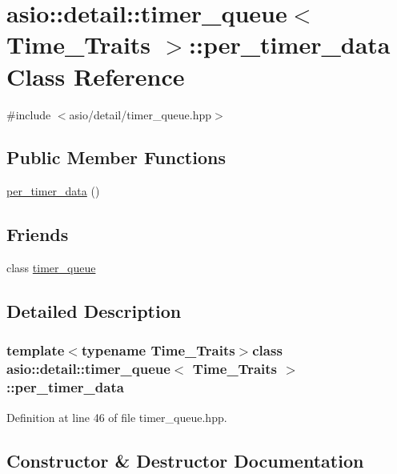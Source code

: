 \hypertarget{classasio_1_1detail_1_1timer__queue_1_1per__timer__data}{}\section{asio\+:\+:detail\+:\+:timer\+\_\+queue$<$ Time\+\_\+\+Traits $>$\+:\+:per\+\_\+timer\+\_\+data Class Reference}
\label{classasio_1_1detail_1_1timer__queue_1_1per__timer__data}


{\ttfamily \#include $<$asio/detail/timer\+\_\+queue.\+hpp$>$}

\subsection*{Public Member Functions}
\begin{DoxyCompactItemize}
\item 
\hyperlink{classasio_1_1detail_1_1timer__queue_1_1per__timer__data_a7481de4d86d55604f5c642d0fcfff383}{per\+\_\+timer\+\_\+data} ()
\end{DoxyCompactItemize}
\subsection*{Friends}
\begin{DoxyCompactItemize}
\item 
class \hyperlink{classasio_1_1detail_1_1timer__queue_1_1per__timer__data_af902b930ce23b4575f973bda3beefedc}{timer\+\_\+queue}
\end{DoxyCompactItemize}


\subsection{Detailed Description}
\subsubsection*{template$<$typename Time\+\_\+\+Traits$>$class asio\+::detail\+::timer\+\_\+queue$<$ Time\+\_\+\+Traits $>$\+::per\+\_\+timer\+\_\+data}



Definition at line 46 of file timer\+\_\+queue.\+hpp.



\subsection{Constructor \& Destructor Documentation}
\hypertarget{classasio_1_1detail_1_1timer__queue_1_1per__timer__data_a7481de4d86d55604f5c642d0fcfff383}{}
